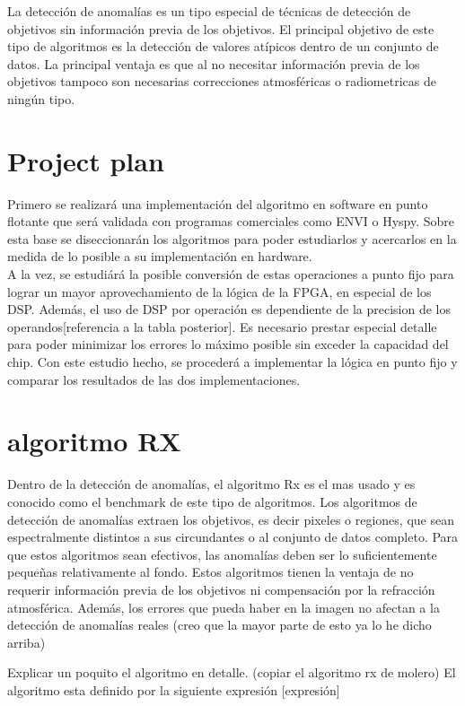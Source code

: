 La detección de anomalías es un tipo especial de técnicas de detección de objetivos sin información previa de los objetivos. El principal objetivo de este tipo de algoritmos es la detección de valores atípicos dentro de un conjunto de datos. La principal ventaja es que al no necesitar información previa de los objetivos tampoco son necesarias correcciones atmosféricas o radiometricas de ningún tipo.


\section{Project plan}
Primero se realizará una implementación del algoritmo en software en punto flotante que será validada con programas comerciales como ENVI o Hyspy. Sobre esta base se diseccionarán los algoritmos para poder estudiarlos y acercarlos en la medida de lo posible a su implementación en hardware.
\\
A la vez, se estudiárá la posible conversión de estas operaciones a punto fijo para lograr un mayor aprovechamiento de la lógica de la FPGA, en especial de los DSP. Además, el uso de DSP por operación es dependiente de la precision de los operandos[referencia a la tabla posterior]. Es necesario prestar especial detalle para poder minimizar los errores lo máximo posible sin exceder la capacidad del chip. Con este estudio hecho, se procederá a implementar la lógica en punto fijo y comparar los resultados de las dos implementaciones.


\section{algoritmo RX}
Dentro de la detección de anomalías, el algoritmo Rx es el mas usado y es conocido como el benchmark de este tipo de algoritmos.
Los algoritmos de detección de anomalías extraen los objetivos, es decir pixeles o regiones, que sean espectralmente distintos a sus circundantes o al conjunto de datos completo. Para que estos algoritmos sean efectivos, las anomalías deben ser lo suficientemente pequeñas relativamente al fondo. Estos algoritmos tienen la ventaja de no requerir información previa de los objetivos ni compensación por la refracción atmosférica. Además, los errores que pueda haber en la imagen no afectan a la detección de anomalías reales (creo que la mayor parte de esto ya lo he dicho arriba)

Explicar un poquito el algoritmo en detalle.
(copiar el algoritmo rx de molero)
El algoritmo esta definido por la siguiente expresión [expresión]


